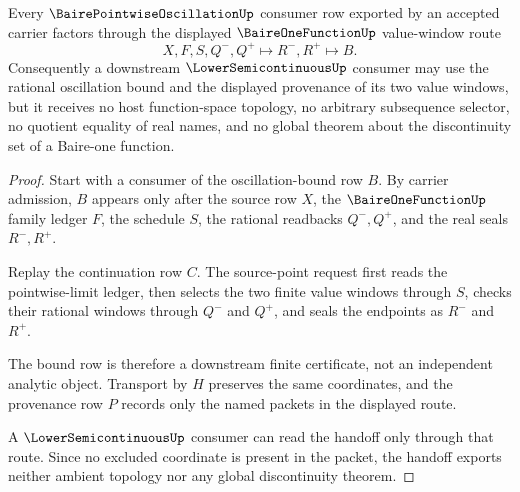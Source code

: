 \begin{theorem}
\label{thm:baire-pointwise-oscillation-baireone-handoff}
Every $\BairePointwiseOscillationUp$ consumer row exported by an accepted carrier factors through the displayed $\BaireOneFunctionUp$ value-window route
$$
X,F,S,Q^-,Q^+ \longmapsto R^-,R^+ \longmapsto B .
$$
Consequently a downstream $\LowerSemicontinuousUp$ consumer may use the rational oscillation bound and the displayed provenance of its two value windows, but it receives no host function-space topology, no arbitrary subsequence selector, no quotient equality of real names, and no global theorem about the discontinuity set of a Baire-one function.
\end{theorem}
\begin{proof}
Start with a consumer of the oscillation-bound row $B$. By carrier admission, $B$ appears only after the source row $X$, the $\BaireOneFunctionUp$ family ledger $F$, the schedule $S$, the rational readbacks $Q^-,Q^+$, and the real seals $R^-,R^+$.

Replay the continuation row $C$. The source-point request first reads the pointwise-limit ledger, then selects the two finite value windows through $S$, checks their rational windows through $Q^-$ and $Q^+$, and seals the endpoints as $R^-$ and $R^+$.

The bound row is therefore a downstream finite certificate, not an independent analytic object. Transport by $H$ preserves the same coordinates, and the provenance row $P$ records only the named packets in the displayed route.

A $\LowerSemicontinuousUp$ consumer can read the handoff only through that route. Since no excluded coordinate is present in the packet, the handoff exports neither ambient topology nor any global discontinuity theorem.
\end{proof}

\begin{closurestatus}{\BairePointwiseOscillationUp}
  \theoryclosure{\seedClosure}
  \formalstatus{\unformalizedV}
\end{closurestatus}
